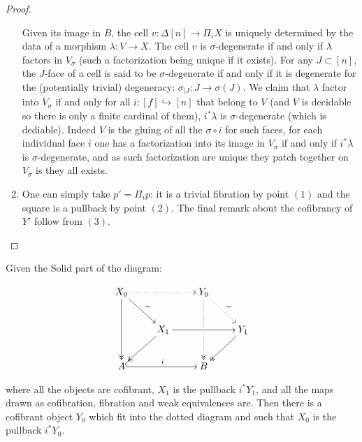 \documentclass[reqno,10pt,a4paper,oneside,draft]{amsart}
\begin{document}
\begin{proof}
\begin{enumerate}
Given its image in $B$, the cell $v: \Delta[n] \rightarrow \Pi_i X$ is uniquely determined by the data of a morphism $\lambda: V\rightarrow X$. The cell $v$ is $\sigma$-degenerate if and only if $\lambda$ factors in $V_{\sigma}$ (such a factorization being unique if it exists). For any $J \subset [n]$, the $J$-face of a cell is said to be $\sigma$-degenerate if and only if it is degenerate for the (potentially trivial) degeneracy: $\sigma_{|J} : J \rightarrow \sigma(J)$. We claim that $\lambda$ factor into $V_{\sigma}$ if and only for all $i:[f] \hookrightarrow [n]$ that belong to $V$ (and $V$ is decidable so there is only a finite cardinal of them), $i^* \lambda$ is $\sigma$-degenerate (which is dediable). Indeed $V$ is the gluing of all the $\sigma \circ i$ for such faces, for each individual face $i$ one has a factorization into its image in $V_{\sigma}$ if and only if $i^* \lambda$ is $\sigma$-degenerate, and as such factorization are unique they patch together on $V_{\sigma}$ is they all exists.

\item One can simply take $p'= \Pi_i p$: it is a trivial fibration by point $(1)$ and the square is a pullback by point $(2)$. The final remark about the cofibrancy of $Y'$ follow from $(3)$.

\end{enumerate}
\end{proof}



\begin{proposition}
\label{Prop:Homotopy_ext_prop}
Given the Solid part of the diagram:

\[ 
\xymatrix{
  X_0
  \ar@{.>}[rr]
  \ar[dr]^{\sim}
  \ar@{->>}[dd]
&&
  Y_0
  \ar@{.>}[dr]^{\sim}
  \ar@{.>>}[dd]|{\hole}
&\\&
  X_1
  \ar[rr]
  \ar@{->>}[dl]
&&
  Y_1
  \ar@{->>}[dl]
\\
  A
  \ar@{^{(}->}[rr]^i
&&
  B
&
}
\]

where all the objects are cofibrant, $X_1$ is the pullback $i^* Y_1$, and all the maps drawn as cofibration, fibration and weak equivalences are. Then there is a cofibrant object $Y_0$ which fit into the dotted diagram and such that $X_0$ is the pullback $i^* Y_0$.



\end{proposition}
\end{document}
